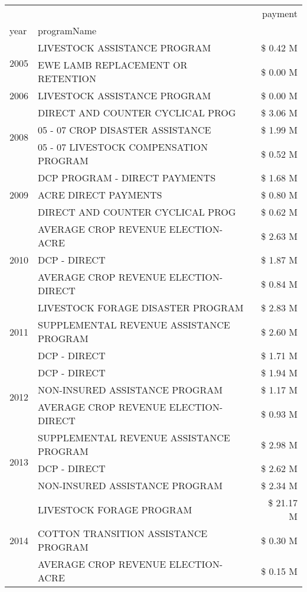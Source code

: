 \begin{tabular}{llr}
\toprule
 &  & payment \\
year & programName &  \\
\midrule
\multirow[t]{2}{*}{2005} & LIVESTOCK ASSISTANCE PROGRAM & \$ 0.42 M \\
 & EWE LAMB REPLACEMENT OR RETENTION & \$ 0.00 M \\
\cline{1-3}
2006 & LIVESTOCK ASSISTANCE PROGRAM & \$ 0.00 M \\
\cline{1-3}
\multirow[t]{3}{*}{2008} & DIRECT AND COUNTER CYCLICAL PROG & \$ 3.06 M \\
 & 05 - 07 CROP DISASTER ASSISTANCE & \$ 1.99 M \\
 & 05 - 07 LIVESTOCK COMPENSATION PROGRAM & \$ 0.52 M \\
\cline{1-3}
\multirow[t]{3}{*}{2009} & DCP PROGRAM - DIRECT PAYMENTS & \$ 1.68 M \\
 & ACRE DIRECT PAYMENTS & \$ 0.80 M \\
 & DIRECT AND COUNTER CYCLICAL PROG & \$ 0.62 M \\
\cline{1-3}
\multirow[t]{3}{*}{2010} & AVERAGE CROP REVENUE ELECTION-ACRE & \$ 2.63 M \\
 & DCP - DIRECT & \$ 1.87 M \\
 & AVERAGE CROP REVENUE ELECTION-DIRECT & \$ 0.84 M \\
\cline{1-3}
\multirow[t]{3}{*}{2011} & LIVESTOCK FORAGE DISASTER PROGRAM & \$ 2.83 M \\
 & SUPPLEMENTAL REVENUE ASSISTANCE PROGRAM & \$ 2.60 M \\
 & DCP - DIRECT & \$ 1.71 M \\
\cline{1-3}
\multirow[t]{3}{*}{2012} & DCP - DIRECT & \$ 1.94 M \\
 & NON-INSURED ASSISTANCE PROGRAM & \$ 1.17 M \\
 & AVERAGE CROP REVENUE ELECTION-DIRECT & \$ 0.93 M \\
\cline{1-3}
\multirow[t]{3}{*}{2013} & SUPPLEMENTAL REVENUE ASSISTANCE PROGRAM & \$ 2.98 M \\
 & DCP - DIRECT & \$ 2.62 M \\
 & NON-INSURED ASSISTANCE PROGRAM & \$ 2.34 M \\
\cline{1-3}
\multirow[t]{3}{*}{2014} & LIVESTOCK FORAGE PROGRAM & \$ 21.17 M \\
 & COTTON TRANSITION ASSISTANCE PROGRAM & \$ 0.30 M \\
 & AVERAGE CROP REVENUE ELECTION-ACRE & \$ 0.15 M \\

\end{tabular}
